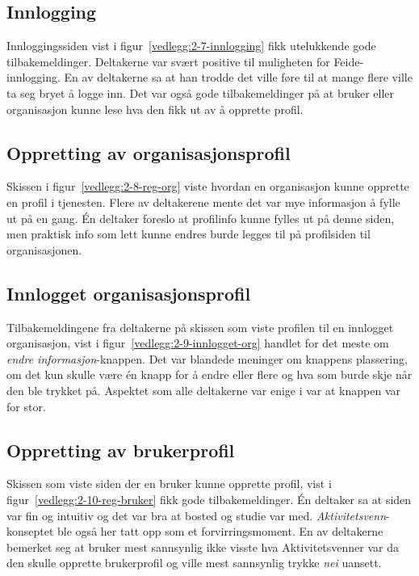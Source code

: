 \subsection{Innlogging}

Innloggingssiden vist i figur~\ref{vedlegg:2-7-innlogging} fikk utelukkende gode tilbakemeldinger. Deltakerne var svært positive til muligheten for Feide-innlogging. En av deltakerne sa at han trodde det ville føre til at mange flere ville ta seg bryet å logge inn. Det var også gode tilbakemeldinger på at bruker eller organisasjon kunne lese hva den fikk ut av å opprette profil.


\subsection{Oppretting av organisasjonsprofil}

Skissen i figur~\ref{vedlegg:2-8-reg-org} viste hvordan en organisasjon kunne opprette en profil i tjenesten. Flere av deltakerene mente det var mye informasjon å fylle ut på en gang. Én deltaker foreslo at profilinfo kunne fylles ut på denne siden, men praktisk info som lett kunne endres burde legges til på profilsiden til organisasjonen.


\subsection{Innlogget organisasjonsprofil}

Tilbakemeldingene fra deltakerne på skissen som viste profilen til en innlogget organisasjon, vist i figur~\ref{vedlegg:2-9-innlogget-org} handlet for det meste om {\em endre informasjon}-knappen. Det var blandede meninger om knappens plassering, om det kun skulle være én knapp for å endre eller flere og hva som burde skje når den ble trykket på. Aspektet som alle deltakerne var enige i var at knappen var for stor.


\subsection{Oppretting av brukerprofil}

Skissen som viste siden der en bruker kunne opprette profil, vist i figur~\ref{vedlegg:2-10-reg-bruker} fikk gode tilbakemeldinger. Én deltaker sa at siden var fin og intuitiv og det var bra at bosted og studie var med. {\em Aktivitetsvenn}-konseptet ble også her tatt opp som et forvirringsmoment. En av deltakerne bemerket seg at bruker mest sannsynlig ikke visste hva Aktivitetsvenner var da den skulle opprette brukerprofil og ville mest sannsynlig trykke {\em nei} uansett.


